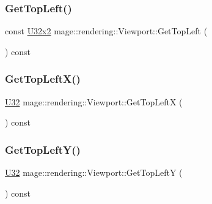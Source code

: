 \hypertarget{classmage_1_1rendering_1_1_viewport_ad87e35df4d1f9ff3208d82c9af565b4d}{}\label{classmage_1_1rendering_1_1_viewport_ad87e35df4d1f9ff3208d82c9af565b4d} 
\subsubsection{\texorpdfstring{Get\+Top\+Left()}{GetTopLeft()}}
{\footnotesize\ttfamily const \hyperlink{namespacemage_a88e05bff0300120c013285d3dcad95c5}{U32x2} mage\+::rendering\+::\+Viewport\+::\+Get\+Top\+Left (\begin{DoxyParamCaption}{ }\end{DoxyParamCaption}) const\hspace{0.3cm}{\ttfamily [noexcept]}}

\hypertarget{classmage_1_1rendering_1_1_viewport_aaaf7eb2b56b5f325c6bd56ea31b19d45}{}\label{classmage_1_1rendering_1_1_viewport_aaaf7eb2b56b5f325c6bd56ea31b19d45} 
\subsubsection{\texorpdfstring{Get\+Top\+Left\+X()}{GetTopLeftX()}}
{\footnotesize\ttfamily \hyperlink{namespacemage_a41c104c036fba3756a74e19f793eeaa1}{U32} mage\+::rendering\+::\+Viewport\+::\+Get\+Top\+LeftX (\begin{DoxyParamCaption}{ }\end{DoxyParamCaption}) const\hspace{0.3cm}{\ttfamily [noexcept]}}

\hypertarget{classmage_1_1rendering_1_1_viewport_a78207536cbba1fbfa82160eb7672ec02}{}\label{classmage_1_1rendering_1_1_viewport_a78207536cbba1fbfa82160eb7672ec02} 
\subsubsection{\texorpdfstring{Get\+Top\+Left\+Y()}{GetTopLeftY()}}
{\footnotesize\ttfamily \hyperlink{namespacemage_a41c104c036fba3756a74e19f793eeaa1}{U32} mage\+::rendering\+::\+Viewport\+::\+Get\+Top\+LeftY (\begin{DoxyParamCaption}{ }\end{DoxyParamCaption}) const\hspace{0.3cm}{\ttfamily [noexcept]}}

